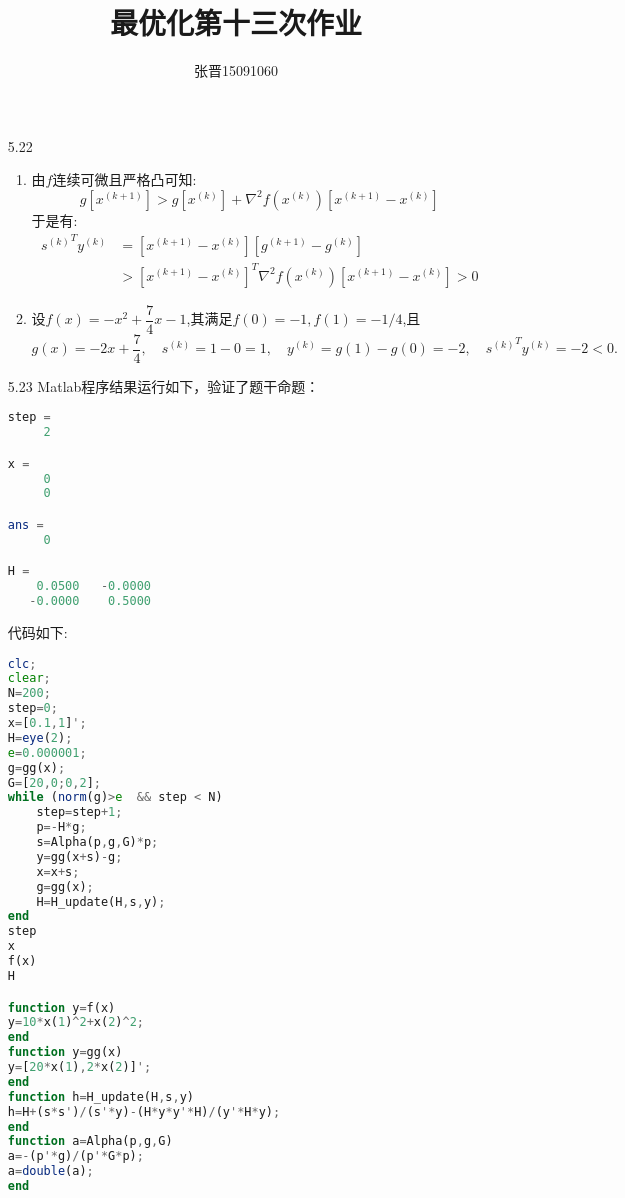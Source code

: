 \documentclass[UTF8]{ctexart}
\title{\heiti 最优化第十三次作业}
\author{\kaishu 张晋15091060}
\begin{document}
\maketitle
\begin{enumerate}
\item[5.22]
\begin{enumerate}
\item
由$f$连续可微且严格凸可知:
\[g[x^{(k+1)}]> g[x^{(k)}]+\nabla^2f(x^{(k)})[x^{(k+1)}-x^{(k)}]\]
于是有:
\begin{align}
{s^{(k)}}^Ty^{(k)}&=[x^{(k+1)}-x^{(k)}][g^{(k+1)}-g^{(k)}]\\
&>[x^{(k+1)}-x^{(k)}]^T\nabla^2f(x^{(k)})[x^{(k+1)}-x^{(k)}]>0
\end{align}
\item 
设$f(x)=-x^2+\dfrac{7}{4}x-1$,其满足$f(0)=-1,f(1)=-1/4$,且$g(x)=-2x+\dfrac{7}{4},\quad s^{(k)}=1-0=1,\quad y^{(k)}=g(1)-g(0)=-2,\quad {s^{(k)}}^Ty^{(k)}=-2<0.$
\end{enumerate}

\item[5.23] Matlab程序结果运行如下，验证了题干命题：

\begin{lstlisting}[language=Octave]
step =
     2

x =
     0
     0

ans =
     0

H =
    0.0500   -0.0000
   -0.0000    0.5000
\end{lstlisting}

\newpage
代码如下:
\begin{lstlisting}[language=Octave]
%   5.23:   精确步长的DFP法
clc;
clear;
N=200;
step=0;
x=[0.1,1]';
H=eye(2);
e=0.000001;
g=gg(x);
G=[20,0;0,2];
while (norm(g)>e  && step < N) 
	step=step+1;
	p=-H*g;
	s=Alpha(p,g,G)*p;
	y=gg(x+s)-g;
	x=x+s;
	g=gg(x);
	H=H_update(H,s,y);
end
step
x
f(x)
H

function y=f(x)
y=10*x(1)^2+x(2)^2;
end
function y=gg(x)
y=[20*x(1),2*x(2)]';
end
function h=H_update(H,s,y)
h=H+(s*s')/(s'*y)-(H*y*y'*H)/(y'*H*y);
end 
function a=Alpha(p,g,G)
a=-(p'*g)/(p'*G*p);
a=double(a);
end
\end{lstlisting}
\end{enumerate}
\end{document}
